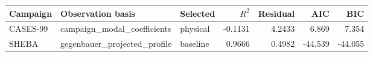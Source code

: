 \begin{tabular}{l l l r r r r}
\toprule
Campaign & Observation basis & Selected & $R^2$ & Residual & AIC & BIC \\
\midrule
CASES-99 & campaign\_modal\_coefficients & physical & -0.1131 & 4.2433 & 6.869 & 7.354 \\
SHEBA & gegenbauer\_projected\_profile & baseline & 0.9666 & 0.4982 & -44.539 & -44.055 \\
\bottomrule
\end{tabular}
